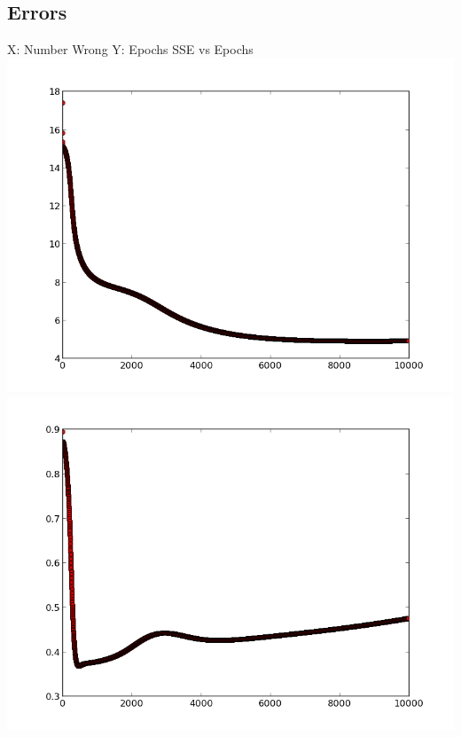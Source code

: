 \documentclass{book}
\begin{document}
\subsection*{Errors}
\hspace{50px}X:  Number Wrong Y: Epochs \hspace{170px} SSE vs Epochs\\
\includegraphics[scale=0.45]{10000iters.png}
\includegraphics[scale=0.45]{error.png}
\end{document}
